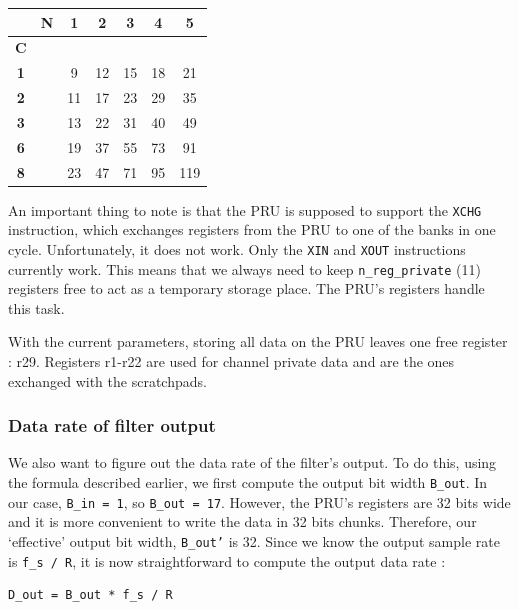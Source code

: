 \documentclass[]{report}
\begin{document}
\begin {table}[H]
\begin{center}
\begin{tabular}{|c|c|c|c|c|c|c|}
	\hline  & \textbf{N} & \textbf{1} & \textbf{2} & \textbf{3} & \textbf{4} & \textbf{5} \\ 
	\hline \textbf{C} & & & & & & \\ 
	\hline  \textbf{1} & & 9 & 12 & 15 & 18 & 21 \\ 
	\hline \textbf{2} & & 11 & 17 & 23 & 29 & 35 \\ 
	\hline  \textbf{3} & & 13 & 22 & 31 & 40 & 49  \\ 
	\hline \textbf{6} & & 19 & 37 & 55 & 73 & 91 \\ 
	\hline \textbf{8} & & 23 & 47 & 71 & 95 & 119  \\ 
	\hline 
\end{tabular} 
\end{center}
\end {table}


An important thing to note is that the PRU is supposed to support the
\texttt{XCHG} instruction, which exchanges registers from the PRU to one of the
banks in one cycle. Unfortunately, it does not work. Only the \texttt{XIN} and
\texttt{XOUT} instructions currently work. This means that we always need to keep
\texttt{n\_reg\_private} (11) registers free to act as a temporary
storage place. The PRU's registers handle this task.

With the current parameters, storing all data on the PRU leaves one free
register : r29. Registers r1-r22 are used for channel private data and
are the ones exchanged with the scratchpads.

\subsubsection{Data rate of filter output}

We also want to figure out the data rate of the filter's output. To do
this, using the formula described earlier, we first compute the output
bit width \texttt{B\_out}. In our case, \texttt{B\_in\ =\ 1}, so
\texttt{B\_out\ =\ 17}. However, the PRU's registers are 32 bits wide
and it is more convenient to write the data in 32 bits chunks.
Therefore, our `effective' output bit width,
\texttt{B\_out'} is 32. Since we know the output sample
rate is \texttt{f\_s\ /\ R}, it is now straightforward to compute the
output data rate :

\begin{verbatim}
D_out = B_out * f_s / R
\end{verbatim}
\end{document}
